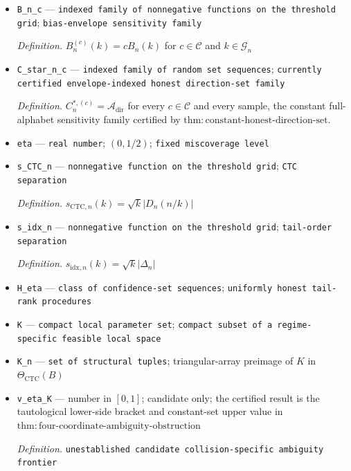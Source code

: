 \documentclass{article}
\begin{document}
\begin{itemize}
  \item \texttt{B\_\allowbreak{}n\_\allowbreak{}c} --- \texttt{indexed family of nonnegative functions on the threshold grid}; \texttt{bias-\allowbreak{}envelope sensitivity family}
  \par\smallskip\noindent\emph{Definition.} \(B_n^{(c)}(k)=cB_n(k)\) for \(c\in\mathcal C\) and \(k\in\mathcal G_n\)
  \item \texttt{C\_\allowbreak{}star\_\allowbreak{}n\_\allowbreak{}c} --- \texttt{indexed family of random set sequences}; \texttt{currently certified envelope-\allowbreak{}indexed honest direction-\allowbreak{}set family}
  \par\smallskip\noindent\emph{Definition.} \(C_n^{*,(c)}=\mathcal A_{\mathrm{dir}}\) for every \(c\in\mathcal C\) and every sample, the constant full-alphabet sensitivity family certified by \(\mathrm{thm{:}constant\text{-}honest\text{-}direction\text{-}set}\).
  \item \texttt{eta} --- \texttt{real number}; \((0,1/2)\); \texttt{fixed miscoverage level}
  \item \texttt{s\_\allowbreak{}CTC\_\allowbreak{}n} --- \texttt{nonnegative function on the threshold grid}; \texttt{CTC separation}
  \par\smallskip\noindent\emph{Definition.} \(s_{\mathrm{CTC},n}(k)=\sqrt{k}|D_n(n/k)|\)
  \item \texttt{s\_\allowbreak{}idx\_\allowbreak{}n} --- \texttt{nonnegative function on the threshold grid}; \texttt{tail-\allowbreak{}order separation}
  \par\smallskip\noindent\emph{Definition.} \(s_{\mathrm{idx},n}(k)=\sqrt{k}|\Delta_n|\)
  \item \texttt{H\_\allowbreak{}eta} --- \texttt{class of confidence-\allowbreak{}set sequences}; \texttt{uniformly honest tail-\allowbreak{}rank procedures}
  \item \texttt{K} --- \texttt{compact local parameter set}; \texttt{compact subset of a regime-\allowbreak{}specific feasible local space}
  \item \texttt{K\_\allowbreak{}n} --- \texttt{set of structural tuples}; triangular-array preimage of \(K\) in \(\Theta_{\mathrm{CTC}}(B)\)
  \item \texttt{v\_\allowbreak{}eta\_\allowbreak{}K} --- number in \([0,1]\); candidate only; the certified result is the tautological lower-side bracket and constant-set upper value in \(\mathrm{thm{:}four\text{-}coordinate\text{-}ambiguity\text{-}obstruction}\)
  \par\smallskip\noindent\emph{Definition.} \texttt{unestablished candidate collision-\allowbreak{}specific ambiguity frontier}

\end{itemize}
\end{document}
